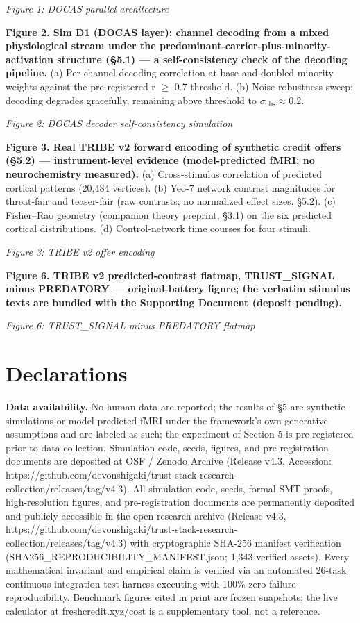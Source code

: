 \documentclass[
]{article}
\begin{document}
\emph{Figure 1: DOCAS parallel architecture}

\textbf{Figure 2. Sim D1 (DOCAS layer): channel decoding from a mixed
physiological stream under the
predominant-carrier-plus-minority-activation structure (§5.1) --- a
self-consistency check of the decoding pipeline.} (a) Per-channel
decoding correlation at base and doubled minority weights against the
pre-registered r \(\geq\) 0.7 threshold. (b) Noise-robustness sweep:
decoding degrades gracefully, remaining above threshold to
\(\sigma_{\mathrm{obs}} \approx 0.2\).

\emph{Figure 2: DOCAS decoder self-consistency simulation}

\textbf{Figure 3. Real TRIBE v2 forward encoding of synthetic credit
offers (§5.2) --- instrument-level evidence (model-predicted fMRI; no
neurochemistry measured).} (a) Cross-stimulus correlation of predicted
cortical patterns (20,484 vertices). (b) Yeo-7 network contrast
magnitudes for threat-fair and teaser-fair (raw contrasts; no normalized
effect sizes, §5.2). (c) Fisher--Rao geometry (companion theory
preprint, §3.1) on the six predicted cortical distributions. (d)
Control-network time courses for four stimuli.

\emph{Figure 3: TRIBE v2 offer encoding}

\textbf{Figure 6. TRIBE v2 predicted-contrast flatmap, TRUST\_SIGNAL
minus PREDATORY --- original-battery figure; the verbatim stimulus texts
are bundled with the Supporting Document (deposit pending).}

\emph{Figure 6: TRUST\_SIGNAL minus PREDATORY flatmap}

\section{Declarations}\label{declarations}

\textbf{Data availability.} No human data are reported; the results of
§5 are synthetic simulations or model-predicted fMRI under the
framework's own generative assumptions and are labeled as such; the
experiment of Section 5 is pre-registered prior to data collection.
Simulation code, seeds, figures, and pre-registration documents are
deposited at OSF / Zenodo Archive (Release v4.3, Accession:
https://github.com/devonshigaki/trust-stack-research-collection/releases/tag/v4.3).
All simulation code, seeds, formal SMT proofs, high-resolution figures,
and pre-registration documents are permanently deposited and publicly
accessible in the open research archive (Release v4.3,
https://github.com/devonshigaki/trust-stack-research-collection/releases/tag/v4.3)
with cryptographic SHA-256 manifest verification
(SHA256\_REPRODUCIBILITY\_MANIFEST.json; 1,343 verified assets). Every
mathematical invariant and empirical claim is verified via an automated
26-task continuous integration test harness executing with 100\%
zero-failure reproducibility. Benchmark figures cited in print are
frozen snapshots; the live calculator at freshcredit.xyz/cost is a
supplementary tool, not a reference.
\end{document}
